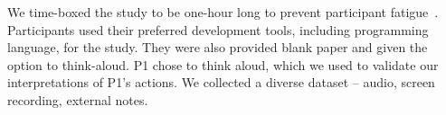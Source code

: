 

We time-boxed the study to be one-hour long to prevent participant fatigue~\cite{Easterbrook:2008}. Participants used their preferred development tools, including programming language, for the study. They were also provided blank paper and given the option to think-aloud. P1 chose to think aloud, which we used to validate our interpretations of P1's actions. We collected a diverse dataset -- audio, screen recording, external notes.




